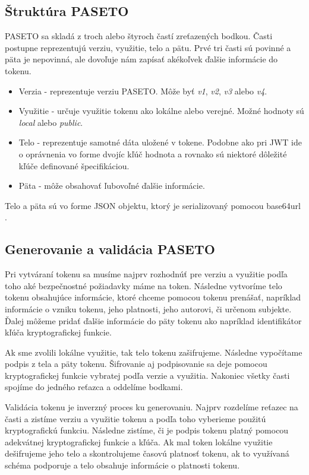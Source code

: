 \subsection{Štruktúra PASETO}

PASETO sa skladá z troch alebo štyroch častí zreťazených bodkou. Časti postupne reprezentujú verziu, využitie, telo a pätu. Prvé tri časti sú povinné a päta je nepovinná, ale dovoľuje nám zapísať akékoľvek ďalšie informácie do tokenu.

\begin{itemize}
    \item Verzia - reprezentuje verziu PASETO. Môže byť \textit{v1}, \textit{v2}, \textit{v3} alebo \textit{v4}.
    \item Využitie - určuje využitie tokenu ako lokálne alebo verejné. Možné hodnoty sú \textit{local} alebo \textit{public}.
    \item Telo - reprezentuje samotné dáta uložené v tokene. Podobne ako pri JWT ide o oprávnenia vo forme dvojíc kľúč hodnota a rovnako sú niektoré dôležité kľúče definované špecifikáciou. \cite{paseto_git}
    \item Päta - môže obsahovať ľubovoľné ďalšie informácie.
\end{itemize}

Telo a päta sú vo forme JSON objektu, ktorý je serializovaný pomocou base64url \cite{base64_rfc}.


\subsection{Generovanie a validácia PASETO}

Pri vytváraní tokenu sa musíme najprv rozhodnúť pre verziu a využitie podľa toho aké bezpečnostné požiadavky máme na token. Následne vytvoríme telo tokenu obsahujúce informácie, ktoré chceme pomocou tokenu prenášať, napríklad informácie o vzniku tokenu, jeho platnosti, jeho autorovi, či určenom subjekte. Ďalej môžeme pridať ďalšie informácie do päty tokenu ako napríklad identifikátor kľúča kryptografickej funkcie. 

Ak sme zvolili lokálne využitie, tak telo tokenu zašifrujeme. Následne vypočítame podpis z tela a päty tokenu. Šifrovanie aj podpisovanie sa deje pomocou kryptografickej funkcie vybratej podľa verzie a využitia. Nakoniec všetky časti spojíme do jedného reťazca a oddelíme bodkami.

Validácia tokenu je inverzný proces ku generovaniu. Najprv rozdelíme reťazec na časti a zistíme verziu a využitie tokenu a podľa toho vyberieme použitú kryptografickú funkciu. Následne zistíme, či je podpis tokenu platný pomocou adekvátnej kryptografickej funkcie a kľúča. Ak mal token lokálne využitie dešifrujeme jeho telo a skontrolujeme časovú platnosť tokenu, ak to využívaná schéma podporuje a telo obsahuje informácie o platnosti tokenu.

